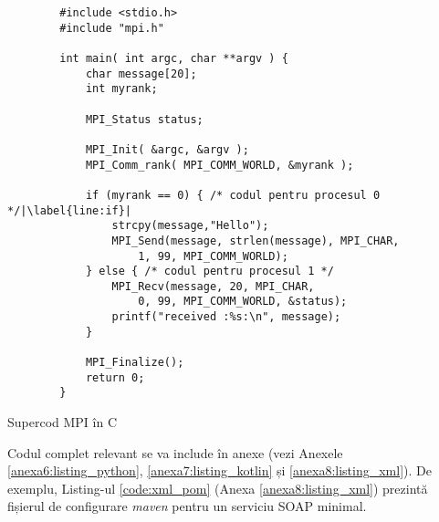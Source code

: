 \begin{code}
    \begin{verbatim}
        #include <stdio.h>
        #include "mpi.h"
        
        int main( int argc, char **argv ) {
        	char message[20];
        	int myrank;	
        		
        	MPI_Status status;
        
        	MPI_Init( &argc, &argv );
        	MPI_Comm_rank( MPI_COMM_WORLD, &myrank );
        	
        	if (myrank == 0) { /* codul pentru procesul 0 */|\label{line:if}|
        		strcpy(message,"Hello");
        		MPI_Send(message, strlen(message), MPI_CHAR, 
        			1, 99, MPI_COMM_WORLD);
        	} else { /* codul pentru procesul 1 */
        		MPI_Recv(message, 20, MPI_CHAR, 
        			0, 99, MPI_COMM_WORLD, &status);
        		printf("received :%s:\n", message);
        	}
        	
        	MPI_Finalize();
        	return 0;
        }
    \end{verbatim}
    \caption{Supercod MPI în C} 
    \label{code:c_mpi}
\end{code}

Codul complet relevant se va include în anexe (vezi Anexele \ref{anexa6:listing_python}, \ref{anexa7:listing_kotlin} și \ref{anexa8:listing_xml}). De exemplu, Listing-ul \ref{code:xml_pom} (Anexa \ref{anexa8:listing_xml}) prezintă fișierul de configurare \textit{maven} pentru un serviciu SOAP minimal.

\textcolor{gray}{\lipsum}

\textcolor{gray}{\lipsum}
